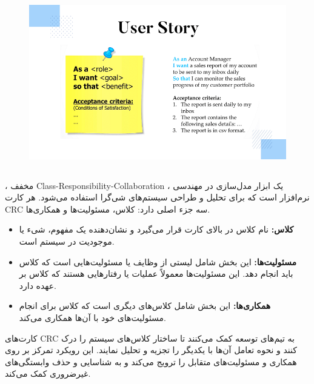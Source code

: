 \begin{figure}[H]
	\centering
	\includegraphics{pic7.png}
	\label{fig:label4}
\end{figure}

\subsection*{}

 ، مخفف Class-Responsibility-Collaboration ، یک ابزار مدل‌سازی در مهندسی نرم‌افزار است که برای تحلیل و طراحی سیستم‌های شی‌گرا استفاده می‌شود. هر کارت CRC سه جزء اصلی دارد: کلاس، مسئولیت‌ها و همکاری‌ها.

\begin{itemize}
	\item \textbf{کلاس:} نام کلاس در بالای کارت قرار می‌گیرد و نشان‌دهنده یک مفهوم، شیء یا موجودیت در سیستم است.
	\item \textbf{مسئولیت‌ها:} این بخش شامل لیستی از وظایف یا مسئولیت‌هایی است که کلاس باید انجام دهد. این مسئولیت‌ها معمولاً عملیات یا رفتارهایی هستند که کلاس بر عهده دارد.
	\item \textbf{همکاری‌ها:} این بخش شامل کلاس‌های دیگری است که کلاس برای انجام مسئولیت‌های خود با آن‌ها همکاری می‌کند.
\end{itemize}

کارت‌های CRC به تیم‌های توسعه کمک می‌کنند تا ساختار کلاس‌های سیستم را درک کنند و نحوه تعامل آن‌ها با یکدیگر را تجزیه و تحلیل نمایند. این رویکرد تمرکز بر روی همکاری و مسئولیت‌های متقابل را ترویج می‌کند و به شناسایی و حذف وابستگی‌های غیرضروری کمک می‌کند.

